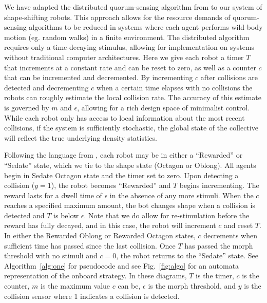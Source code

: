 \documentclass[runningheads]{llncs}
\begin{document}
We have adapted the distributed quorum-sensing algorithm from \cite{pavlic2021quorum} to our system of shape-shifting robots. This approach allows for the resource demands of quorum-sensing algorithms to be reduced in systems where each agent performs wild body motion (eg. random walks) in a finite environment. The distributed algorithm requires only a time-decaying stimulus, allowing for implementation on systems without traditional computer architectures. Here we give each robot a timer $T$ that increments at a constant rate and can be reset to zero, as well as a counter $c$ that can be incremented and decremented. By incrementing $c$ after collisions are detected and decrementing $c$ when a certain time elapses with no collisions the robots can roughly estimate the local collision rate. The accuracy of this estimate is governed by $m$ and $\epsilon$, allowing for a rich design space of minimalist control. While each robot only has access to local information about the most recent collisions, if the system is sufficiently stochastic, the global state of the collective will reflect the true underlying density statistics.

Following the language from \cite{pavlic2021quorum}, each robot may be in either a ``Rewarded'' or ``Sedate'' state, which we tie to the shape state (Octagon or Oblong). All agents begin in Sedate Octagon state and the timer set to zero. Upon detecting a collision ($y=1$), the robot becomes ``Rewarded'' and $T$ begins incrementing. The reward lasts for a dwell time of $\epsilon$ in the absence of any more stimuli. When the $c$ reaches a specified maximum amount, the bot changes shape when a collision is detected and $T$ is below $\epsilon$. Note that we do allow for re-stimulation before the reward has fully decayed, and in this case, the robot will increment $c$ and reset $T$. In either the Rewarded Oblong or Rewarded Octagon states, $c$ decrements when sufficient time has passed since the last collision. Once $T$ has passed the morph threshold with no stimuli and $c=0$, the robot returns to the ``Sedate'' state. See Algorithm~\ref{alg:one} for pseudocode and see Fig.~\ref{fig:algo} for an automata representation of the onboard strategy. In these diagrams, $T$ is the timer, $c$ is the counter, $m$ is the maximum value $c$ can be, $\epsilon$ is the morph threshold, and $y$ is the collision sensor where 1 indicates a collision is detected.
\end{document}
